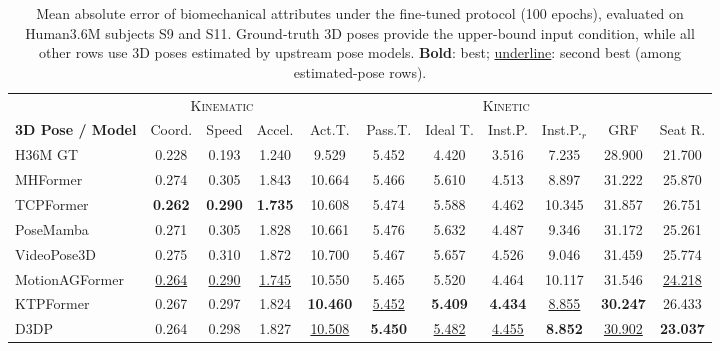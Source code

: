 \begin{table}[t]
\centering
\caption{%
  Mean absolute error of biomechanical attributes under the fine-tuned protocol (100 epochs),
  evaluated on Human3.6M subjects S9 and S11.
  Ground-truth 3D poses provide the upper-bound input condition, while all other rows use 3D poses estimated by upstream pose models.
  \textbf{Bold}: best; \underline{underline}: second best (among estimated-pose rows).}
\label{tab:ft100_results}
\footnotesize
\setlength{\tabcolsep}{2.5pt}

\begin{tabular}{l ccc ccccccc}
\toprule
& \multicolumn{3}{c}{\textsc{Kinematic}}
& \multicolumn{7}{c}{\textsc{Kinetic}} \\
\cmidrule(lr){2-4} \cmidrule(lr){5-11}
\textbf{3D Pose / Model}
& Coord.  & Speed   & Accel.
& Act.T.  & Pass.T. & Ideal T. & Inst.P. & Inst.P.$_r$ & GRF   & Seat R. \\
\midrule
H36M GT
  & 0.228 & 0.193 & 1.240 & 9.529 & 5.452 & 4.420 & 3.516 & 7.235 & 28.900 & 21.700 \\
\midrule

MHFormer
  & 0.274  & 0.305  & 1.843  & 10.664  & 5.466  & 5.610  & 4.513  & 8.897  & 31.222  & 25.870 \\

TCPFormer
  & \textbf{0.262}  & \textbf{0.290}  & \textbf{1.735}  & 10.608  & 5.474  & 5.588  & 4.462  & 10.345  & 31.857  & 26.751 \\

PoseMamba
  & 0.271  & 0.305  & 1.828  & 10.661  & 5.476  & 5.632  & 4.487  & 9.346  & 31.172  & 25.261 \\

VideoPose3D
  & 0.275  & 0.310  & 1.872  & 10.700  & 5.467  & 5.657  & 4.526  & 9.046  & 31.459  & 25.774 \\

MotionAGFormer
  & \underline{0.264}  & \underline{0.290}  & \underline{1.745}  & 10.550  & 5.465  & 5.520  & 4.464  & 10.117  & 31.546  & \underline{24.218} \\

KTPFormer
  & 0.267  & 0.297  & 1.824  & \textbf{10.460}  & \underline{5.452}  & \textbf{5.409}  & \textbf{4.434}  & \underline{8.855}  & \textbf{30.247}  & 26.433 \\

D3DP
  & 0.264  & 0.298  & 1.827  & \underline{10.508}  & \textbf{5.450}  & \underline{5.482}  & \underline{4.455}  & \textbf{8.852}  & \underline{30.902}  & \textbf{23.037} \\


\end{tabular}
\end{table}
